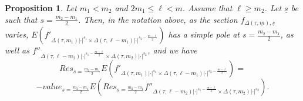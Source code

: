 \documentclass[12pts]{amsart}
\newtheorem{prop}[thm]{Proposition}
\begin{document}
    \begin{prop}\label{prop 3.1}
    	Let $m_1< m_2$ and $2m_1\leq \ell < m$. Assume that $\ell\geq m_2$. Let $\underline{s}$ be such that $s=\frac{m_2-m_1}{2}$. Then, in the notation above, as the section $f_{\Delta(\tau,\underline{m}),\underline{s}}$ varies, $E(f'_{\Delta(\tau,m_1)|\cdot|^{s_1}\times \Delta(\tau,\ell-m_1)|\cdot|^{s_2-\frac{m-\ell}{2}}})$ has a simple pole at $s=\frac{m_2-m_1}{2}$, as well as $f''_{\Delta(\tau,\ell-m_2)|\cdot|^{s_1-\frac{m-\ell}{2}}\times \Delta(\tau,m_2)|\cdot|^{s_2}}$, and we have
    	\begin{equation}\label{3.3}
    		Res_{s=\frac{m_2-m_1}{2}}E(f'_{\Delta(\tau,m_1)|\cdot|^{s_1}\times \Delta(\tau,\ell-m_1)|\cdot|^{s_2-\frac{m-\ell}{2}}})=
    	\end{equation}
    	$$
    	-value_{s=\frac{m_2-m_1}{2}}E(Res_{s=\frac{m_2-m_1}{2}}f''_{\Delta(\tau,\ell-m_2)|\cdot|^{s_1-\frac{m-\ell}{2}}\times \Delta(\tau,m_2)|\cdot|^{s_2}}).
    	$$
    \end{prop}
\end{document}
